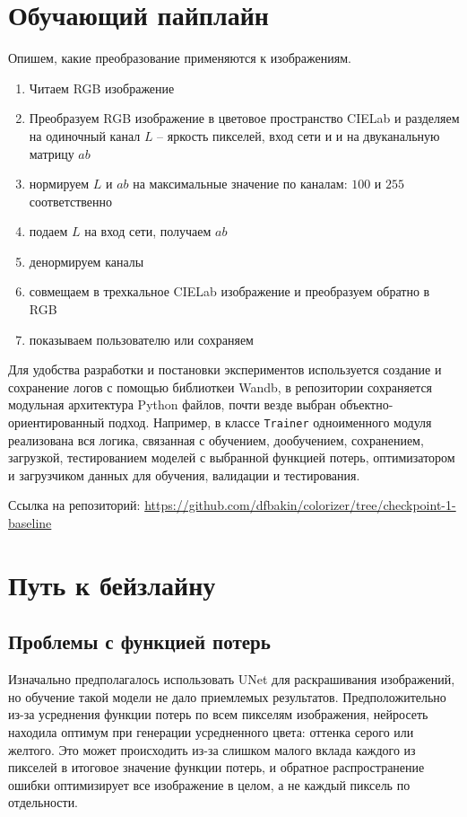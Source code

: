 \documentclass[14pt]{article}
\begin{document}
\section{Обучающий пайплайн}
Опишем, какие преобразование применяются к изображениям.
\begin{enumerate}
    \item Читаем RGB изображение
    \item Преобразуем RGB изображение в цветовое пространство CIELab и разделяем на одиночный канал $L$ -- яркость пикселей, вход сети и
        и на двуканальную матрицу $ab$
    \item нормируем $L$ и $ab$ на максимальные значение по каналам: $100$ и $255$ соответственно
    \item подаем $L$ на вход сети, получаем $ab$
    \item денормируем каналы
    \item совмещаем в трехкальное CIELab изображение и преобразуем обратно в RGB
    \item показываем пользователю или сохраняем
\end{enumerate}

Для удобства разработки и постановки экспериментов используется создание и сохранение логов с помощью библиоткеи Wandb,
в репозитории сохраняется модульная архитектура Python файлов, почти везде выбран объектно-ориентированный подход. Например,
в классе \texttt{Trainer} одноименного модуля реализована вся логика, связанная с обучением, дообучением, сохранением, загрузкой, тестированием моделей
с выбранной функцией потерь, оптимизатором и загрузчиком данных для обучения, валидации и тестирования.

Ссылка на репозиторий: \url{https://github.com/dfbakin/colorizer/tree/checkpoint-1-baseline}



\section{Путь к бейзлайну}
\subsection{Проблемы с функцией потерь}

Изначально предполагалось использовать UNet для раскрашивания изображений, но обучение такой модели
не дало приемлемых результатов. Предположительно из-за усреднения функции потерь по всем пикселям изображения,
нейросеть находила оптимум при генерации усредненного цвета: оттенка серого или желтого. Это может происходить
из-за слишком малого вклада каждого из пикселей в итоговое значение функции потерь, и
обратное распространение ошибки оптимизирует все изображение в целом, а не каждый пиксель по отдельности.
\end{document}
